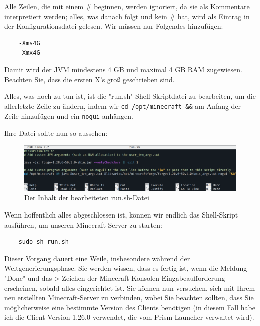 \documentclass[]{article}
\begin{document}
Alle Zeilen, die mit einem \# beginnen, werden ignoriert, da sie als Kommentare interpretiert werden; alles, was danach folgt und kein \# hat, wird als Eintrag in der Konfigurationsdatei gelesen. Wir müssen nur Folgendes hinzufügen:

\begin{verbatim}
	-Xms4G
	-Xmx4G
\end{verbatim}

Damit wird der JVM mindestens 4 GB und maximal 4 GB RAM zugewiesen. Beachten Sie, dass die ersten X's groß geschrieben sind.

Alles, was noch zu tun ist, ist die "run.sh"-Shell-Skriptdatei zu bearbeiten, um die allerletzte Zeile zu ändern, indem wir \texttt{cd /opt/minecraft \&\&} am Anfang der Zeile hinzufügen und ein \texttt{nogui} anhängen.

Ihre Datei sollte nun so aussehen:

\begin{figure}[h!]
	\caption{Der Inhalt der bearbeiteten run.sh-Datei}
	\centering
	\includegraphics[width=1\textwidth]{run-sh}
\end{figure}
\FloatBarrier

Wenn hoffentlich alles abgeschlossen ist, können wir endlich das Shell-Skript ausführen, um unseren Minecraft-Server zu starten:

\begin{verbatim}
	sudo sh run.sh
\end{verbatim}

Dieser Vorgang dauert eine Weile, insbesondere während der Weltgenerierungsphase. Sie werden wissen, dass es fertig ist, wenn die Meldung "Done" und das >-Zeichen der Minecraft-Konsolen-Eingabeaufforderung erscheinen, sobald alles eingerichtet ist. Sie können nun versuchen, sich mit Ihrem neu erstellten Minecraft-Server zu verbinden, wobei Sie beachten sollten, dass Sie möglicherweise eine bestimmte Version des Clients benötigen (in diesem Fall habe ich die Client-Version 1.26.0 verwendet, die vom Prism Launcher verwaltet wird).
\end{document}
